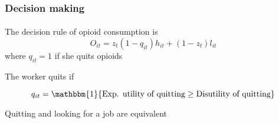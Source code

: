\begin{frame}

    \label{decision_making}
    \frametitle{Decision making} %
    \framesubtitle{}  %
    \rmfamily %

    \begin{wideitemize}
        \item The \textcolor{fblu}{decision rule of opioid consumption} is
        \[
        O_{it} = z_{t}\left(1-q_{it}\right)h_{it} + (1-z_{t})l_{it}
        \]
        where \(q_{it} = 1\) \textcolor{fblu}{if she quits opioids}
        \item The worker quits if
        
        \[
        q_{it} = \mathbbm{1}\{\text{Exp. utility of quitting} \geq \text{Disutility of quitting}\}
        \]
        \vspace{-15pt}
        \item Quitting and looking for a job are equivalent
    \end{wideitemize}

\end{frame}

\begin{comment}
\begin{frame}
2
    \frametitle{Labor demand} %
    \framesubtitle{}  %
    \rmfamily %

    \begin{wideitemize}
        \item The \textcolor{fblu}{representative firm} maximizes profits
        \[
        \pi_{it} = Y_{it} - w_{it}L_{it} \quad \text{s.t} \quad w_t \geq w^{min}_t
        \]
        \vspace{-15pt}
        \item The \textcolor{fblu}{MPL} is given by
        \[
        \dfrac{\partial Y_{it}}{\partial L_{it}} = f(\theta_{it}) - \kappa\cdot\mathbbm{1}\{O_{it}\geq o\}
        \]
        where \(\theta_{it}\) is the \textcolor{fblu}{worker's ability} and \(\kappa\) captures the \textcolor{fblu}{impact of addiction on productivity}
    \end{wideitemize}

\end{frame}
\end{comment}

